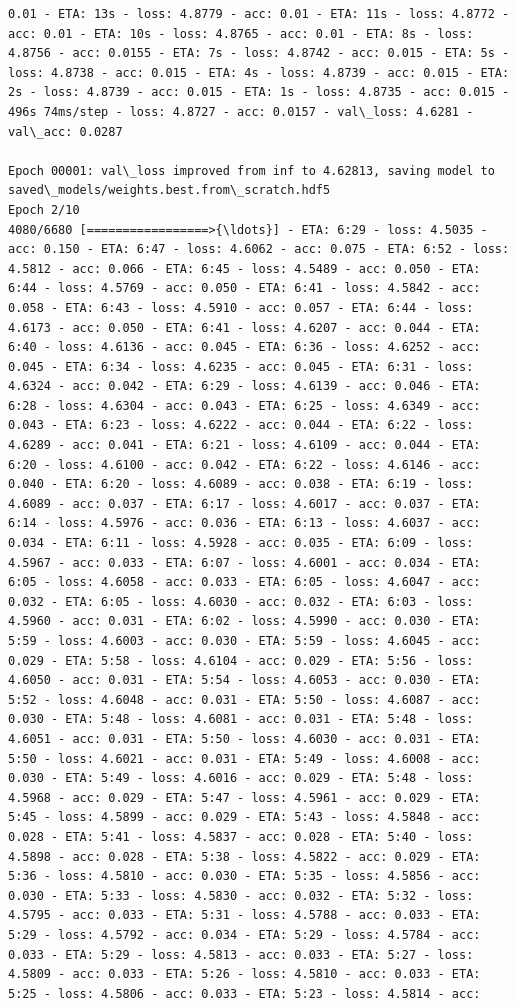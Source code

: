 \documentclass[11pt]{article}
\begin{document}
\begin{Verbatim}[commandchars=\\\{\}]
0.01 - ETA: 13s - loss: 4.8779 - acc: 0.01 - ETA: 11s - loss: 4.8772 - acc: 0.01 - ETA: 10s - loss: 4.8765 - acc: 0.01 - ETA: 8s - loss: 4.8756 - acc: 0.0155 - ETA: 7s - loss: 4.8742 - acc: 0.015 - ETA: 5s - loss: 4.8738 - acc: 0.015 - ETA: 4s - loss: 4.8739 - acc: 0.015 - ETA: 2s - loss: 4.8739 - acc: 0.015 - ETA: 1s - loss: 4.8735 - acc: 0.015 - 496s 74ms/step - loss: 4.8727 - acc: 0.0157 - val\_loss: 4.6281 - val\_acc: 0.0287

Epoch 00001: val\_loss improved from inf to 4.62813, saving model to saved\_models/weights.best.from\_scratch.hdf5
Epoch 2/10
4080/6680 [=================>{\ldots}] - ETA: 6:29 - loss: 4.5035 - acc: 0.150 - ETA: 6:47 - loss: 4.6062 - acc: 0.075 - ETA: 6:52 - loss: 4.5812 - acc: 0.066 - ETA: 6:45 - loss: 4.5489 - acc: 0.050 - ETA: 6:44 - loss: 4.5769 - acc: 0.050 - ETA: 6:41 - loss: 4.5842 - acc: 0.058 - ETA: 6:43 - loss: 4.5910 - acc: 0.057 - ETA: 6:44 - loss: 4.6173 - acc: 0.050 - ETA: 6:41 - loss: 4.6207 - acc: 0.044 - ETA: 6:40 - loss: 4.6136 - acc: 0.045 - ETA: 6:36 - loss: 4.6252 - acc: 0.045 - ETA: 6:34 - loss: 4.6235 - acc: 0.045 - ETA: 6:31 - loss: 4.6324 - acc: 0.042 - ETA: 6:29 - loss: 4.6139 - acc: 0.046 - ETA: 6:28 - loss: 4.6304 - acc: 0.043 - ETA: 6:25 - loss: 4.6349 - acc: 0.043 - ETA: 6:23 - loss: 4.6222 - acc: 0.044 - ETA: 6:22 - loss: 4.6289 - acc: 0.041 - ETA: 6:21 - loss: 4.6109 - acc: 0.044 - ETA: 6:20 - loss: 4.6100 - acc: 0.042 - ETA: 6:22 - loss: 4.6146 - acc: 0.040 - ETA: 6:20 - loss: 4.6089 - acc: 0.038 - ETA: 6:19 - loss: 4.6089 - acc: 0.037 - ETA: 6:17 - loss: 4.6017 - acc: 0.037 - ETA: 6:14 - loss: 4.5976 - acc: 0.036 - ETA: 6:13 - loss: 4.6037 - acc: 0.034 - ETA: 6:11 - loss: 4.5928 - acc: 0.035 - ETA: 6:09 - loss: 4.5967 - acc: 0.033 - ETA: 6:07 - loss: 4.6001 - acc: 0.034 - ETA: 6:05 - loss: 4.6058 - acc: 0.033 - ETA: 6:05 - loss: 4.6047 - acc: 0.032 - ETA: 6:05 - loss: 4.6030 - acc: 0.032 - ETA: 6:03 - loss: 4.5960 - acc: 0.031 - ETA: 6:02 - loss: 4.5990 - acc: 0.030 - ETA: 5:59 - loss: 4.6003 - acc: 0.030 - ETA: 5:59 - loss: 4.6045 - acc: 0.029 - ETA: 5:58 - loss: 4.6104 - acc: 0.029 - ETA: 5:56 - loss: 4.6050 - acc: 0.031 - ETA: 5:54 - loss: 4.6053 - acc: 0.030 - ETA: 5:52 - loss: 4.6048 - acc: 0.031 - ETA: 5:50 - loss: 4.6087 - acc: 0.030 - ETA: 5:48 - loss: 4.6081 - acc: 0.031 - ETA: 5:48 - loss: 4.6051 - acc: 0.031 - ETA: 5:50 - loss: 4.6030 - acc: 0.031 - ETA: 5:50 - loss: 4.6021 - acc: 0.031 - ETA: 5:49 - loss: 4.6008 - acc: 0.030 - ETA: 5:49 - loss: 4.6016 - acc: 0.029 - ETA: 5:48 - loss: 4.5968 - acc: 0.029 - ETA: 5:47 - loss: 4.5961 - acc: 0.029 - ETA: 5:45 - loss: 4.5899 - acc: 0.029 - ETA: 5:43 - loss: 4.5848 - acc: 0.028 - ETA: 5:41 - loss: 4.5837 - acc: 0.028 - ETA: 5:40 - loss: 4.5898 - acc: 0.028 - ETA: 5:38 - loss: 4.5822 - acc: 0.029 - ETA: 5:36 - loss: 4.5810 - acc: 0.030 - ETA: 5:35 - loss: 4.5856 - acc: 0.030 - ETA: 5:33 - loss: 4.5830 - acc: 0.032 - ETA: 5:32 - loss: 4.5795 - acc: 0.033 - ETA: 5:31 - loss: 4.5788 - acc: 0.033 - ETA: 5:29 - loss: 4.5792 - acc: 0.034 - ETA: 5:29 - loss: 4.5784 - acc: 0.033 - ETA: 5:29 - loss: 4.5813 - acc: 0.033 - ETA: 5:27 - loss: 4.5809 - acc: 0.033 - ETA: 5:26 - loss: 4.5810 - acc: 0.033 - ETA: 5:25 - loss: 4.5806 - acc: 0.033 - ETA: 5:23 - loss: 4.5814 - acc: 
\end{Verbatim}
\end{document}
